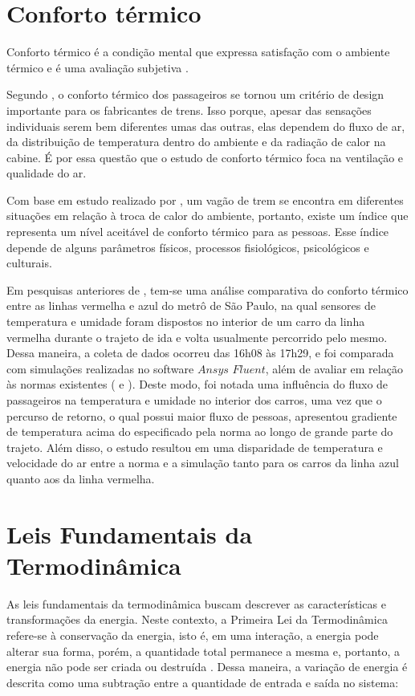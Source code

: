 \documentclass[acronym,symbols]{fei}
\begin{document}
\section{Conforto térmico}

Conforto térmico é a condição mental que expressa satisfação com o ambiente térmico e é uma avaliação subjetiva \cite{ASHRAE2009}.

Segundo \textcite{konstantinov2015numerical}, o conforto térmico dos passageiros se tornou um critério de design importante para os fabricantes de trens. Isso porque, apesar das sensações individuais serem bem diferentes umas das outras, elas dependem do fluxo de ar, da distribuição de temperatura dentro do ambiente e da radiação de calor na cabine. É por essa questão que o estudo de conforto térmico foca na ventilação e qualidade do ar.

Com base em estudo realizado por \textcite{casellisimulaccao}, um vagão de trem se encontra em diferentes situações em relação à troca de calor do ambiente, portanto, existe um índice que representa um nível aceitável de conforto térmico para as pessoas. Esse índice depende de alguns parâmetros físicos, processos fisiológicos, psicológicos e culturais.

Em pesquisas anteriores de \textcite{TCCThomas}, tem-se uma análise comparativa do conforto térmico entre as linhas vermelha e azul do metrô de São Paulo, na qual sensores de temperatura e umidade foram dispostos no interior de um carro da linha vermelha durante o trajeto de ida e volta usualmente percorrido pelo mesmo. Dessa maneira, a coleta de dados ocorreu das 16h08 às 17h29, e foi comparada com simulações realizadas no software $Ansys$ $Fluent$, além de avaliar em relação às normas existentes (\cite{en200614750} e \cite{handbook2006american}). Deste modo, foi notada uma influência do fluxo de passageiros na temperatura e umidade no interior dos carros, uma vez que o percurso de retorno, o qual possui maior fluxo de pessoas, apresentou gradiente de temperatura acima do especificado pela norma ao longo de grande parte do trajeto. Além disso, o estudo resultou em uma disparidade de temperatura e velocidade do ar entre a norma e a simulação tanto para os carros da linha azul quanto aos da linha vermelha.

\section{Leis Fundamentais da Termodinâmica} 
As leis fundamentais da termodinâmica buscam descrever as características e transformações da energia. Neste contexto, a Primeira Lei da Termodinâmica refere-se à conservação da energia, isto é, em uma interação, a energia pode alterar sua forma, porém, a quantidade total permanece a mesma e, portanto, a energia não pode ser criada ou destruída \cite{ccengel2006termodinamica}. Dessa maneira, a variação de energia é descrita como uma subtração entre a quantidade de entrada e saída no sistema:
\end{document}
